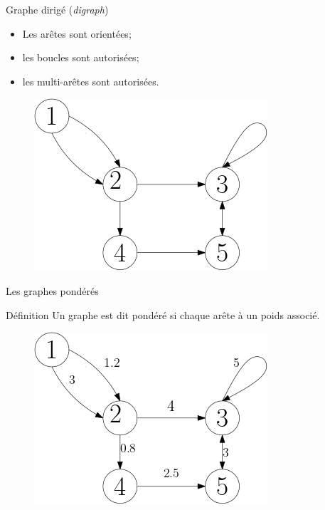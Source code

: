 \documentclass[10pt,xcolor=dvipsnames]{beamer}
\newcommand{\defin}[1]{\textcolor{darkspringgreen}{#1}}
\begin{document}
\begin{frame}{Graphe dirigé (\textit{digraph})}
    \begin{itemize}
        \item Les arêtes sont orientées;
        \item les boucles sont autorisées;
        \item les multi-arêtes sont autorisées.
    \end{itemize}
    
    \begin{figure}
        \centering
        \includegraphics[scale=0.5]{figures/CM3/directed-graph.png}
        \label{fig:my_label}
    \end{figure}
\end{frame}

\begin{frame}{Les graphes pondérés}
    \begin{exampleblock}{Définition}
    Un graphe est dit \defin{pondéré} si chaque arête à un \defin{poids} associé.
    \end{exampleblock}
    
    \begin{figure}
        \centering
        \includegraphics[scale=0.5]{figures/CM3/weighted-graph.png}
        \label{fig:my_label}
    \end{figure}
\end{frame}
\end{document}
